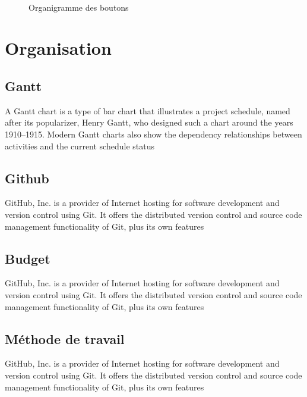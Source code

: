 {\begin{figure}[H] 
\centering
{}\\[0.5cm]
\caption{Organigramme des boutons}
\label{fig:figure17}
\end{figure}


\pagebreak
{}

\chapter{Organisation}\thispagestyle{fancy}
\section{Gantt}
A Gantt chart is a type of bar chart that illustrates a project schedule, named after its popularizer, Henry Gantt, who designed such a chart around the years 1910–1915. Modern Gantt charts also show the dependency relationships between activities and the current schedule status

\section{Github}
GitHub, Inc. is a provider of Internet hosting for software development and version control using Git. It offers the distributed version control and source code management functionality of Git, plus its own features

\section{Budget}
GitHub, Inc. is a provider of Internet hosting for software development and version control using Git. It offers the distributed version control and source code management functionality of Git, plus its own features


\section{Méthode de travail}
GitHub, Inc. is a provider of Internet hosting for software development and version control using Git. It offers the distributed version control and source code management functionality of Git, plus its own features

}
